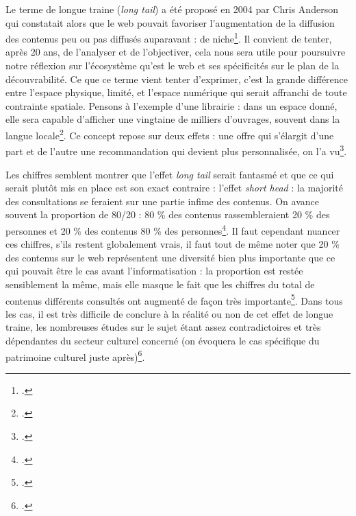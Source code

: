 Le terme de longue traine (\textit{long tail}) a été proposé en 2004 par Chris Anderson qui constatait alors que le web pouvait favoriser l’augmentation de la diffusion des contenus peu ou pas diffusés auparavant : de niche\footcite[§ 8]{benghozi_longue_2008}. Il convient de tenter, après 20 ans, de l’analyser et de l’objectiver, cela nous sera utile pour poursuivre notre réflexion sur l’écosystème qu’est le web et ses spécificités sur le plan de la découvrabilité. Ce que ce terme vient tenter d’exprimer, c’est la grande différence entre l’espace physique, limité, et l’espace numérique qui serait affranchi de toute contrainte spatiale. Pensons à l’exemple d’une librairie : dans un espace donné, elle sera capable d’afficher une vingtaine de milliers d’ouvrages, souvent dans la langue locale\footcite[§ 11 et § 12]{benghozi_longue_2008}. Ce concept repose sur deux effets : une offre qui s’élargit d’une part et de l’autre une recommandation qui devient plus personnalisée, on l’a vu\footcite[§ 17]{bourreau2015a}.

Les chiffres semblent montrer que l’effet \textit{long tail} serait fantasmé et que ce qui serait plutôt mis en place est son exact contraire : l’effet \textit{short head} : la majorité des consultations se feraient sur une partie infime des contenus. On avance souvent la proportion de 80/20 : 80 \% des contenus rassembleraient 20 \% des personnes et 20 \% des contenus 80 \% des personnes\footcite[§ 10]{bourreau2015a}. Il faut cependant nuancer ces chiffres, s’ils restent globalement vrais, il faut tout de même noter que 20 \% des contenus sur le web représentent une diversité bien plus importante que ce qui pouvait être le cas avant l’informatisation : la proportion est restée sensiblement la même, mais elle masque le fait que les chiffres du total de contenus différents consultés ont augmenté de façon très importante\footcite[§ 15]{bourreau2015a}. Dans tous les cas, il est très difficile de conclure à la réalité ou non de cet effet de longue traine, les nombreuses études sur le sujet étant assez contradictoires et très dépendantes du secteur culturel concerné (on évoquera le cas spécifique du patrimoine culturel juste après)\footcite[tableau 1]{bourreau2015a}.

